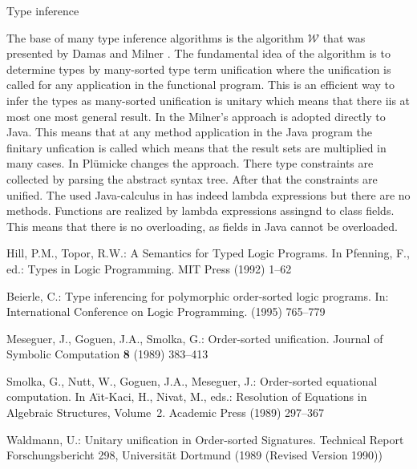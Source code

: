 Type inference

The base of many type inference algorithms is the algorithm $\mathcal{W}$
that was presented by Damas and Milner \cite{DM82}. The fundamental idea
of the algorithm is to determine types by many-sorted type term
unification \cite{Rob65, MM82} where the unification is called for any
application in the functional program. This is an efficient way to infer the types
as many-sorted unification is unitary which means that there iis at most one
most general result.  In \cite{Plue07_3} the Milner's approach is adopted
directly to Java. This means that at any method application in the Java program
the finitary unfication is called which means that the result sets are multiplied in
many cases. In \cite{plue15_2} Pl\"umicke changes the approach. There 
type constraints are collected by parsing the abstract syntax tree. After that the
constraints are unified. The used Java-calculus in \cite{plue15_2} has
indeed lambda expressions but there are no methods. Functions are realized by
lambda expressions assingnd to class fields. This means that there is no
overloading, as fields in Java cannot be overloaded.



\begin{thebibliography}{5}
Hill, P.M., Topor, R.W.:
\newblock A {S}emantics for {T}yped {L}ogic {P}rograms.
\newblock In Pfenning, F., ed.: Types in Logic Programming.
\newblock MIT Press (1992)  1--62

Beierle, C.:
\newblock Type inferencing for polymorphic order-sorted logic programs.
\newblock In: International Conference on Logic Programming. (1995)  765--779

Meseguer, J., Goguen, J.A., Smolka, G.:
\newblock Order-sorted unification.
\newblock Journal of Symbolic Computation \textbf{8} (1989)  383--413

Smolka, G., Nutt, W., Goguen, J.A., Meseguer, J.:
\newblock Order-sorted equational computation.
\newblock In A{\"\i}t-Kaci, H., Nivat, M., eds.: Resolution of Equations in
  Algebraic Structures, Volume~2.
\newblock Academic Press (1989)  297--367

Waldmann, U.:
\newblock Unitary unification in {O}rder-sorted {S}ignatures.
\newblock Technical Report Forschungsbericht 298, Universit{\"a}t Dortmund
  (1989 (Revised Version 1990))
\end{thebibliography}


